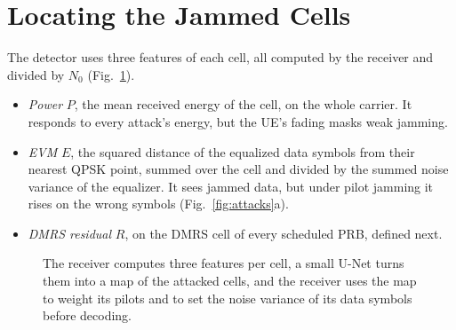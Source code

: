 \documentclass[conference]{IEEEtran}
\begin{document}
\section{Locating the Jammed Cells}

The detector uses three features of each cell, all computed by the receiver and divided by $N_0$
(Fig.~\ref{fig:pipeline}).
\begin{itemize}
\item \emph{Power} $P$, the mean received energy of the cell, on the whole carrier. It responds to
  every attack's energy, but the UE's fading masks weak jamming.
\item \emph{EVM} $E$, the squared distance of the equalized data symbols from their nearest QPSK
  point, summed over the cell and divided by the summed noise variance of the equalizer. It sees
  jammed data, but under pilot jamming it rises on the wrong symbols (Fig.~\ref{fig:attacks}a).
\item \emph{DMRS residual} $R$, on the DMRS cell of every scheduled PRB, defined next.
\end{itemize}

\begin{figure}[t]
\centering
{}
\caption{The receiver computes three features per cell, a small U-Net turns them into a map of
the attacked cells, and the receiver uses the map to weight its pilots and to set the noise
variance of its data symbols before decoding.}
\label{fig:pipeline}
\end{figure}
\end{document}
